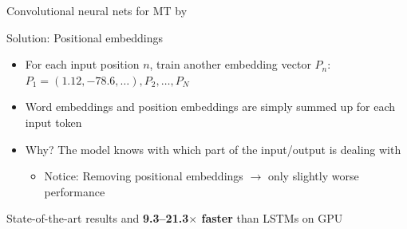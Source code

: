\documentclass[12pt]{beamer}
\begin{document}
\begin{frame}{Convolutional neural nets for MT by \citet{Gehring.et.al.2017a.ICML}}
	
Solution: Positional embeddings
	
\begin{itemize}
	\item For each input position $n$, train another embedding vector $P_n$: $P_1 = (1.12, -78.6, \dots), P_2, \dots, P_N$
	
	\item Word embeddings and position embeddings are simply summed up for each input token
	
	\item Why? The model knows with which part of the input/output is dealing with
	
	\begin{itemize}
		\item Notice: Removing positional embeddings $\to$ only slightly worse performance
	\end{itemize}

	
\end{itemize}


State-of-the-art results and \textbf{9.3--21.3$\times$ faster} than LSTMs on GPU
	
\end{frame}
\end{document}
